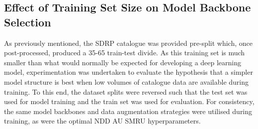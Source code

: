 \subsection{Effect of Training Set Size on Model Backbone Selection}\label{ch:SNNEvaluation,sec:SDRP,sub:SDRPDataset,sub:reversedSDRP}

 As previously mentioned, the SDRP catalogue was provided pre-split which, once post-processed, produced a 35-65 train-test divide. As this training set is much smaller than what would normally be expected for developing a deep learning model, experimentation was undertaken to evaluate the hypothesis that a simpler model structure is best when low volumes of catalogue data are available during training. To this end, the dataset splits were reversed such that the test set was used for model training and the train set was used for evaluation. For consistency, the same model backbones and data augmentation strategies were utilised during training, as were the optimal NDD AU SMRU hyperparameters. 
 
